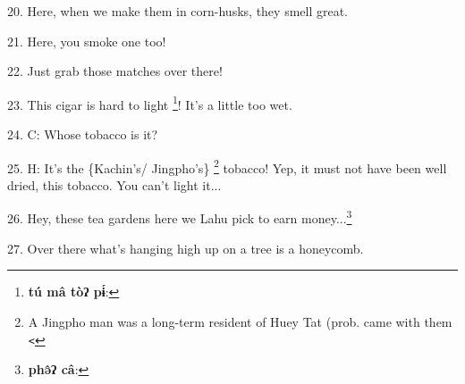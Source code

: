 20. Here, when we make them in corn-husks, they smell great.

21. Here, you smoke one too!

22. Just grab those matches over there!

23. This cigar is hard to light \footnote{\textbf{tú mâ tòʔ  pɨ́}:}! It's a little too wet.

24. C: Whose tobacco is it?

25. H: It's the \{Kachin's/ Jingpho's\} \footnote{A Jingpho man was a long-term resident of Huey Tat (prob. came with them \texttt{<}} tobacco! Yep, it must not have been
well dried, this tobacco. You can't light it...

26. Hey, these tea gardens here we Lahu pick to earn money...\footnote{\textbf{phə̂ʔ câ}:}

27. Over there what's hanging high up on a tree is a honeycomb.

